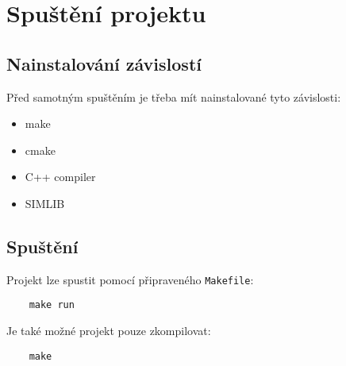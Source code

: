 \documentclass{article}
\begin{document}
\section{Spuštění projektu}

\subsection*{Nainstalování závislostí}

Před samotným spuštěním je třeba mít nainstalované tyto závislosti:
\begin{itemize}
    \item make
    \item cmake
    \item C++ compiler
    \item SIMLIB
\end{itemize}

\subsection*{Spuštění}

Projekt lze spustit pomocí připraveného \texttt{Makefile}:
\begin{verbatim}
    make run
\end{verbatim}

\noindent Je také možné projekt pouze zkompilovat:
\begin{verbatim}
    make
\end{verbatim}

\newpage
\nocite{*}
\printbibliography
\end{document}
